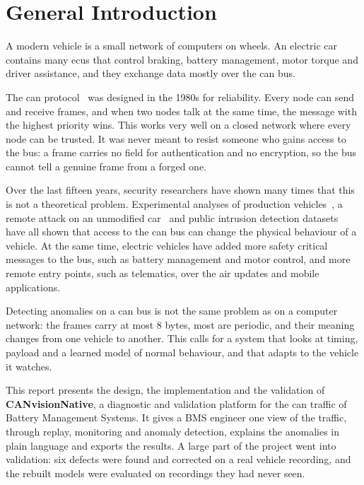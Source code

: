 \chapter*{General Introduction}

A modern vehicle is a small network of computers on wheels. An electric car contains many \glspl{ecu} that control braking, battery management, motor torque and driver assistance, and they exchange data mostly over the \gls{can} bus.

The \gls{can} protocol~\cite{iso11898} was designed in the 1980s for reliability. Every node can send and receive frames, and when two nodes talk at the same time, the message with the highest priority wins. This works very well on a closed network where every node can be trusted. It was never meant to resist someone who gains access to the bus: a frame carries no field for authentication and no encryption, so the bus cannot tell a genuine frame from a forged one.

Over the last fifteen years, security researchers have shown many times that this is not a theoretical problem. Experimental analyses of production vehicles~\cite{koscher2010experimental,checkoway2011comprehensive}, a remote attack on an unmodified car~\cite{miller2015remote} and public intrusion detection datasets~\cite{seo2018gids,verma2020road} have all shown that access to the \gls{can} bus can change the physical behaviour of a vehicle. At the same time, electric vehicles have added more safety critical messages to the bus, such as battery management and motor control, and more remote entry points, such as telematics, over the air updates and mobile applications.

Detecting anomalies on a \gls{can} bus is not the same problem as on a computer network: the frames carry at most 8 bytes, most are periodic, and their meaning changes from one vehicle to another. This calls for a system that looks at timing, payload and a learned model of normal behaviour, and that adapts to the vehicle it watches.

This report presents the design, the implementation and the validation of \textbf{CANvisionNative}, a diagnostic and validation platform for the \gls{can} traffic of Battery Management Systems. It gives a BMS engineer one view of the traffic, through replay, monitoring and anomaly detection, explains the anomalies in plain language and exports the results. A large part of the project went into validation: six defects were found and corrected on a real vehicle recording, and the rebuilt models were evaluated on recordings they had never seen.

